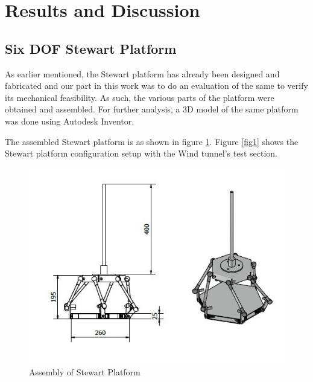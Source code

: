 \section{Results and Discussion}
\subsection{Six DOF Stewart Platform}
As earlier mentioned, the Stewart platform has already been designed and fabricated and our part in this work was to do an evaluation of the same to verify its mechanical feasibility. As such, the various parts of the platform were obtained and assembled. For further analysis, a 3D model of the same platform was done using Autodesk Inventor.

The assembled Stewart platform is as shown in figure \ref{fig}. Figure \ref{fig1} shows the Stewart platform configuration setup with the Wind tunnel's test section.
\begin{center}
	\begin{figure}[H]
		\centering
		\includegraphics[width=1\linewidth]{Figures/Assembly.JPG}
		\caption[Assembled Platform]{Assembly of Stewart Platform}
		\label{fig}
	\end{figure}
\end{center}
